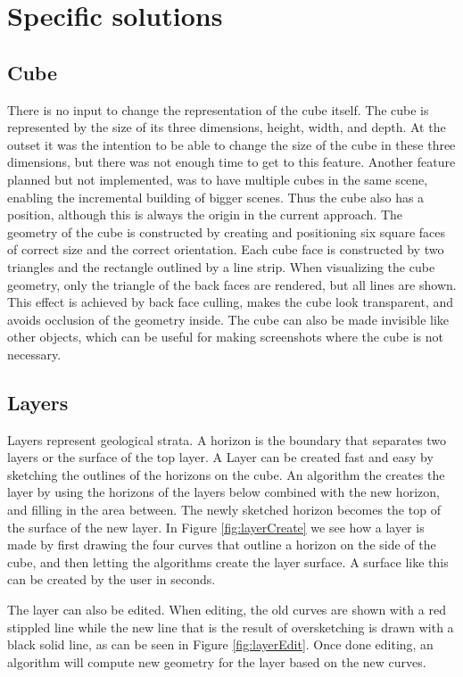 \documentclass[a4paper,12pt]{report}
\begin{document}
\section{Specific solutions}
\label{subsec:indepth}

\subsection{Cube}
There is no input to change the representation of the cube itself. The cube is represented by the size of its three dimensions, height, width, and depth. At the outset it was the intention to be able to change the size of the cube in these three dimensions, but there was not enough time to get to this feature. Another feature planned but not implemented, was to have multiple cubes in the same scene, enabling the incremental building of bigger scenes. Thus the cube also has a position, although this is always the origin in the current approach. The geometry of the cube is constructed by creating and positioning six square faces of correct size and the correct orientation. Each cube face is constructed by two triangles and the rectangle outlined by a line strip. When visualizing the cube geometry, only the triangle of the back faces are rendered, but all lines are shown. This effect is achieved by back face culling, makes the cube look transparent, and avoids occlusion of the geometry 
inside. The cube can also be made invisible like other objects, which can be useful for making screenshots where the cube is not necessary.

\subsection{Layers}
\label{subsec:layers}
Layers represent geological strata. A horizon is the boundary that separates two layers or the surface of the top layer. A Layer can be created fast and easy by sketching the outlines of the horizons on the cube. An algorithm the creates the layer by using the horizons of the layers below combined with the new horizon, and filling in the area between. The newly sketched horizon becomes the top of the surface of the new layer. In Figure \ref{fig:layerCreate} we see how a layer is made by first drawing the four curves that outline a horizon on the side of the cube, and then letting the algorithms create the layer surface. A surface like this can be created by the user in seconds.

The layer can also be edited. When editing, the old curves are shown with a red stippled line while the new line that is the result of oversketching is drawn with a black solid line, as can be seen in Figure \ref{fig:layerEdit}. Once done editing, an algorithm will compute new geometry for the layer based on the new curves.
\end{document}
